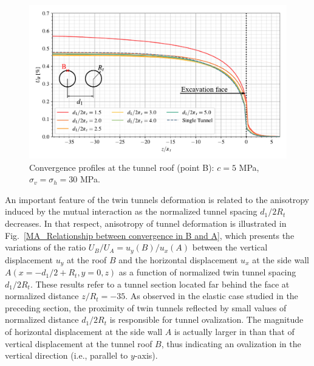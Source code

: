 \documentclass[a4paper,fleqn]{cas-sc}
\begin{document}
\begin{figure}[h!]
	\centering
	\includegraphics[scale=0.65]{MA_Convergence Profiles in B.pdf}
	\caption{Convergence profiles at the tunnel roof (point B): $c=5$ MPa, $\sigma_v = \sigma_h = 30$ MPa.}
	\label{MA_convergence_profile_B}
\end{figure}
\FloatBarrier

An important feature of the twin tunnels deformation is related to the anisotropy induced by the mutual interaction as the normalized tunnel spacing $d_1/2R_t$ decreases. In that respect, anisotropy of tunnel deformation is illustrated in Fig.~\ref{MA_Relationship between convergence in B and A}, which presents the variations of the ratio $U_B/U_A = u_y(B)/u_x(A)$ between the vertical displacement $u_y$ at the roof $B$ and the horizontal displacement $u_x$ at the side wall $A(x =-d_1/2+R_t, y = 0, z)$ as a function of  normalized twin tunnel spacing $d_1/2R_t$. These results refer to a tunnel section located far behind the face at normalized distance $z/R_t = -35$. As observed in the elastic case studied in the preceding section, the proximity of twin tunnels reflected by small values of normalized distance $d_1/2R_t$ is responsible for tunnel ovalization. The magnitude of horizontal displacement at the side wall $A$ is actually larger in than that of vertical displacement at the tunnel roof $B$, thus indicating an ovalization in the vertical direction (i.e., parallel to $y$-axis).
\end{document}

